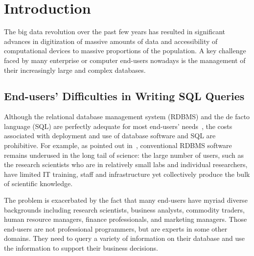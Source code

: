\section{Introduction}
\label{sec:introduction}


The big data revolution over the past few years has resulted
in significant advances in digitization of massive amounts
of data and accessibility of computational devices to massive
proportions of the population. A key challenge faced by many
enterprise or computer end-users nowadays is the management
of their increasingly large and complex databases.




\subsection{End-users' Difficulties in Writing SQL Queries}
Although the relational database management system (RDBMS) and the
de facto language (SQL) are perfectly adequate for most end-users'
needs~\cite{Howe:2011}, the costs associated with deployment and
use of database software and SQL are prohibitive. 
For example, as pointed out in~\cite{Gray:2005},
conventional RDBMS software remains underused
in the long tail of science: the large number of users, such as the
research scientists who are in relatively small labs and individual
researchers, have limited IT training, staff and infrastructure yet
collectively produce the bulk of scientific knowledge. 

The problem is exacerbated by the fact that many end-users
have myriad diverse backgrounds including research scientists,
business analysts, commodity traders, human resource managers,
finance professionals, and marketing managers. 
Those end-users are not professional programmers, but are experts in some
other domains. They need to query a variety of information on their
database and use the information to support their business decisions.


